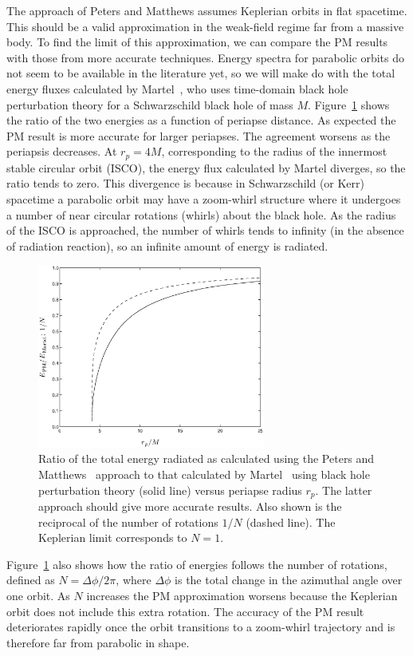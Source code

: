\documentclass[aps,prd,amsfonts,amssymb,amsmath,nofootinbib,floatfix,reprint,showpacs,groupedaddress]{revtex4-1}
\newcommand{\Figref}[1]{Figure~\ref{fig:#1}}
\begin{document}
The approach of Peters and Matthews assumes Keplerian orbits in flat spacetime. This should be a valid approximation in the weak-field regime far from a massive body. To find the limit of this approximation, we can compare the PM results with those from more accurate techniques. Energy spectra for parabolic orbits do not seem to be available in the literature yet, so we will make do with the total energy fluxes calculated by Martel~\cite{Martel2004a}, who uses time-domain black hole perturbation theory for a Schwarzschild black hole of mass $M$. \Figref{Ratio} shows the ratio of the two energies as a function of periapse distance. As expected the PM result is more accurate for larger periapses. The agreement worsens as the periapsis decreases. At $r_{p} = 4 M$, corresponding to the radius of the innermost stable circular orbit (ISCO), the energy flux calculated by Martel diverges, so the ratio tends to zero. This divergence is because in Schwarzschild (or Kerr) spacetime a parabolic orbit may have a zoom-whirl structure where it undergoes a number of near circular rotations (whirls) about the black hole. As the radius of the ISCO is approached, the number of whirls tends to infinity (in the absence of radiation reaction), so an infinite amount of energy is radiated.
\begin{figure}
\includegraphics[width=75mm]{Ratio_2.eps}
\caption{Ratio of the total energy radiated as calculated using the Peters and Matthews~\cite{Peters1963} approach to that calculated by Martel~\cite{Martel2004a} using black hole perturbation theory (solid line) versus periapse radius $r_{p}$. The latter approach should give more accurate results. Also shown is the reciprocal of the number of rotations $1/N$ (dashed line). The Keplerian limit corresponds to $N = 1$.\label{fig:Ratio}}
\end{figure}
\Figref{Ratio} also shows how the ratio of energies follows the number of rotations, defined as $N = {\Delta \phi}/{2\pi}$, where $\Delta \phi$ is the total change in the azimuthal angle over one orbit. As $N$ increases the PM approximation worsens because the Keplerian orbit does not include this extra rotation. The accuracy of the PM result deteriorates rapidly once the orbit transitions to a zoom-whirl trajectory and is therefore far from parabolic in shape.
\end{document}
